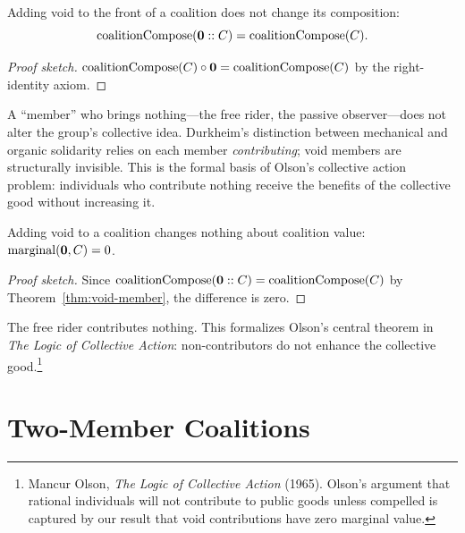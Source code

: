 \begin{theorem}
\label{thm:void-member}
Adding void to the front of a coalition does not change its composition:
\[
  \operatorname{coalitionCompose}(\mathbf{0} :: C) = \operatorname{coalitionCompose}(C).
\]
\end{theorem}

\begin{proof}[Proof sketch]
$\operatorname{coalitionCompose}(C) \circ \mathbf{0} =
\operatorname{coalitionCompose}(C)$ by the right-identity axiom.
\end{proof}

A ``member'' who brings nothing---the free rider, the passive observer---does
not alter the group's collective idea.  Durkheim's distinction between
mechanical and organic solidarity relies on each member \emph{contributing};
void members are structurally invisible.  This is the formal basis of
Olson's collective action problem: individuals who contribute nothing receive
the benefits of the collective good without increasing it.

\begin{theorem}
\label{thm:void-marginal}
Adding void to a coalition changes nothing about coalition value:
$\operatorname{marginal}(\mathbf{0}, C) = 0$.
\end{theorem}

\begin{proof}[Proof sketch]
Since $\operatorname{coalitionCompose}(\mathbf{0} :: C) =
\operatorname{coalitionCompose}(C)$ by Theorem~\ref{thm:void-member}, the
difference is zero.
\end{proof}

The free rider contributes nothing.  This formalizes Olson's central theorem
in \textit{The Logic of Collective Action}: non-contributors do not enhance
the collective good.\footnote{Mancur Olson, \textit{The Logic of Collective
Action} (1965).  Olson's argument that rational individuals will not
contribute to public goods unless compelled is captured by our result that
void contributions have zero marginal value.}

\section{Two-Member Coalitions}
\label{sec:ch13-dyad}

